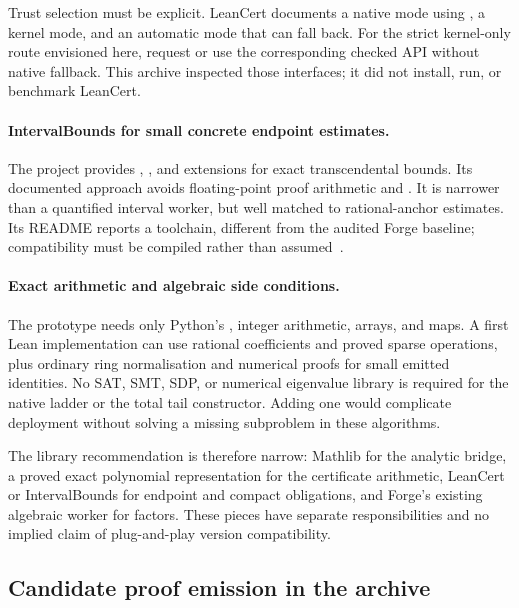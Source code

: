 Trust selection must be explicit. LeanCert documents a native mode using
, a kernel mode, and an automatic mode that can fall back.
For the strict kernel-only route envisioned here, request
 or use the corresponding checked API without
native fallback. This archive inspected those interfaces; it did not install,
run, or benchmark LeanCert.

\paragraph{IntervalBounds for small concrete endpoint estimates.}
The  project provides ,
, and  extensions for exact transcendental
bounds. Its documented approach avoids floating-point proof arithmetic and
. It is narrower than a quantified interval worker, but
well matched to rational-anchor estimates. Its README reports a
 toolchain, different from the audited Forge baseline;
compatibility must be compiled rather than assumed~\cite{intervalbounds}.

\paragraph{Exact arithmetic and algebraic side conditions.}
The prototype needs only Python's , integer arithmetic, arrays,
and maps. A first Lean implementation can use rational coefficients and proved
sparse operations, plus ordinary ring normalisation and numerical proofs for
small emitted identities. No SAT, SMT, SDP, or numerical eigenvalue library is
required for the native ladder or the total tail constructor. Adding one would
complicate deployment without solving a missing subproblem in these algorithms.

The library recommendation is therefore narrow: Mathlib for the analytic bridge,
a proved exact polynomial representation for the certificate arithmetic,
LeanCert or IntervalBounds for endpoint and compact obligations, and Forge's
existing algebraic worker for factors. These pieces have separate responsibilities
and no implied claim of plug-and-play version compatibility.

\subsection{Candidate proof emission in the archive}

